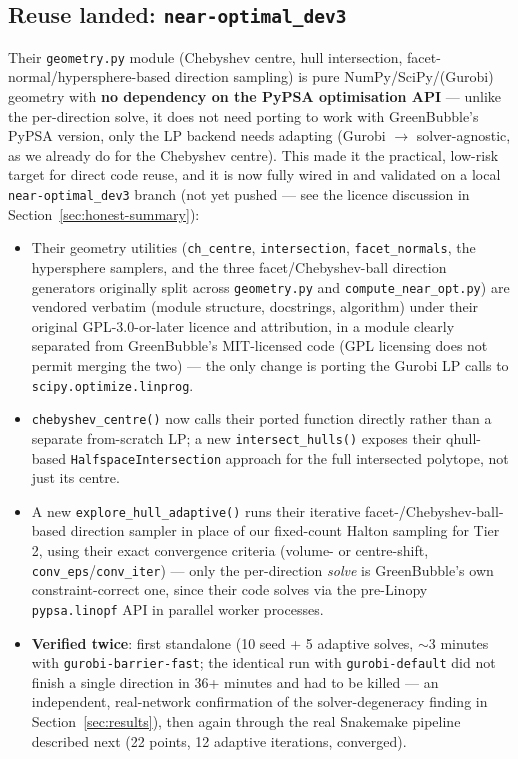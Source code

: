 \documentclass[11pt]{article}
\begin{document}
\subsection{Reuse landed: \texttt{near-optimal\_dev3}}
\label{sec:dev3}
Their \texttt{geometry.py} module (Chebyshev centre, hull intersection,
facet-normal/hypersphere-based direction sampling) is pure
NumPy/SciPy/(Gurobi) geometry with \textbf{no dependency on the PyPSA
optimisation API} --- unlike the per-direction solve, it does not need
porting to work with GreenBubble's PyPSA version, only the LP backend needs
adapting (Gurobi $\to$ solver-agnostic, as we already do for the Chebyshev
centre). This made it the practical, low-risk target for direct code
reuse, and it is now fully wired in and validated on a local
\texttt{near-optimal\_dev3} branch (not yet pushed --- see the licence
discussion in Section~\ref{sec:honest-summary}):
\begin{itemize}[leftmargin=1.4em]
  \item Their geometry utilities (\texttt{ch\_centre}, \texttt{intersection},
    \texttt{facet\_normals}, the hypersphere samplers, and the three
    facet/Chebyshev-ball direction generators originally split across
    \texttt{geometry.py} and \texttt{compute\_near\_opt.py}) are vendored
    verbatim (module structure, docstrings, algorithm) under their original
    GPL-3.0-or-later licence and attribution, in a module clearly separated
    from GreenBubble's MIT-licensed code (GPL licensing does not permit
    merging the two) --- the only change is porting the Gurobi LP calls to
    \texttt{scipy.optimize.linprog}.
  \item \texttt{chebyshev\_centre()} now calls their ported function
    directly rather than a separate from-scratch LP; a new
    \texttt{intersect\_hulls()} exposes their qhull-based
    \texttt{HalfspaceIntersection} approach for the full intersected
    polytope, not just its centre.
  \item A new \texttt{explore\_hull\_adaptive()} runs their iterative
    facet-/Chebyshev-ball-based direction sampler in place of our fixed-count
    Halton sampling for Tier 2, using their exact convergence criteria
    (volume- or centre-shift, \texttt{conv\_eps}/\texttt{conv\_iter}) ---
    only the per-direction \emph{solve} is GreenBubble's own
    constraint-correct one, since their code solves via the pre-Linopy
    \texttt{pypsa.linopf} API in parallel worker processes.
  \item \textbf{Verified twice}: first standalone (10 seed + 5 adaptive
    solves, $\sim$3 minutes with \texttt{gurobi-}\allowbreak\texttt{barrier-fast};
    the identical run with \texttt{gurobi-default} did not finish a single
    direction in 36+ minutes and had to be killed --- an independent, real-network
    confirmation of the solver-degeneracy finding in
    Section~\ref{sec:results}), then again through the real Snakemake
    pipeline described next (22 points, 12 adaptive iterations, converged).
\end{itemize}
\end{document}
